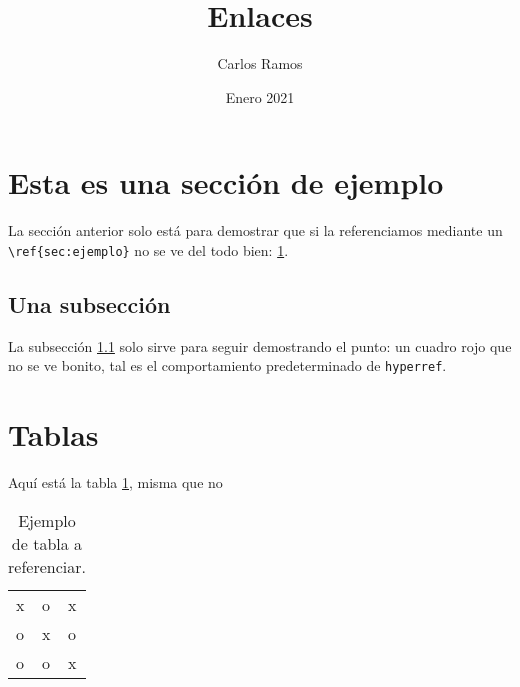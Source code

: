 \documentclass{article}
\title{Enlaces}
\author{Carlos Ramos}
\date{Enero 2021}
\begin{document}
\maketitle

\section{Esta es una sección de ejemplo}
\label{sec:ejemplo}

La sección anterior solo está para demostrar que si la referenciamos mediante un \texttt{\textbackslash{}ref\{sec:ejemplo\}} no se ve del todo bien: \ref{sec:ejemplo}.

\subsection{Una subsección}
\label{sub:ejemplo}

La subsección \ref{sub:ejemplo} solo sirve para seguir demostrando el punto: un cuadro rojo que no se ve bonito, tal es el comportamiento predeterminado de \texttt{hyperref}.

\section{Tablas}
\label{sec:tablas}

Aquí está la tabla \ref{tab:ejemplo}, misma que no

\begin{table}[ht!]
	\centering
	\begin{tabular}{lll}
		x & o & x \\
		o & x & o \\
		o & o & x
	\end{tabular}
	\caption{Ejemplo de tabla a referenciar.}
	\label{tab:ejemplo}
\end{table}
\end{document}
